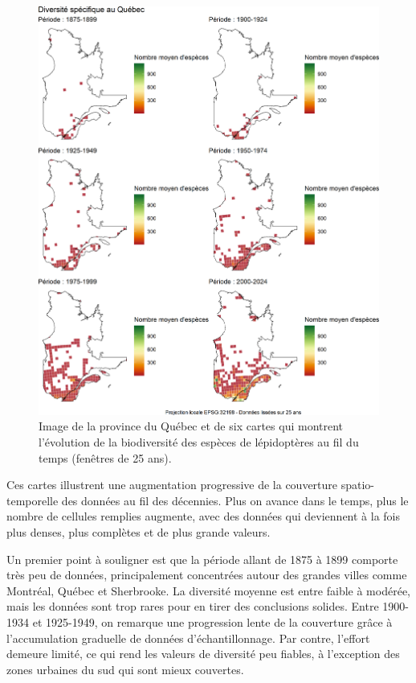 \documentclass[9pt,twocolumn,twoside,]{pnas-new}
\begin{document}
\begin{figure}

\includegraphics[width=1\linewidth]{cartes_combinees} \hfill{}

\caption{Image de la province du Québec et de six cartes qui montrent l'évolution de la biodiversité des espèces de lépidoptères au fil du temps (fenêtres de 25 ans).}\label{fig:fig_cartes_combinees, fullpage-figure}
\end{figure}

Ces cartes illustrent une augmentation progressive de la couverture
spatio-temporelle des données au fil des décennies. Plus on avance dans
le temps, plus le nombre de cellules remplies augmente, avec des données
qui deviennent à la fois plus denses, plus complètes et de plus grande
valeurs.

Un premier point à souligner est que la période allant de 1875 à 1899
comporte très peu de données, principalement concentrées autour des
grandes villes comme Montréal, Québec et Sherbrooke. La diversité
moyenne est entre faible à modérée, mais les données sont trop rares
pour en tirer des conclusions solides. Entre 1900-1934 et 1925-1949, on
remarque une progression lente de la couverture grâce à l'accumulation
graduelle de données d'échantillonnage. Par contre, l'effort demeure
limité, ce qui rend les valeurs de diversité peu fiables, à l'exception
des zones urbaines du sud qui sont mieux couvertes.
\end{document}
